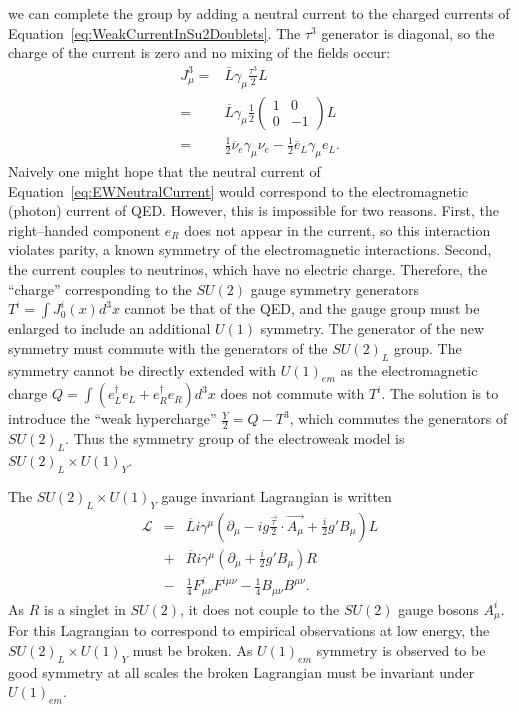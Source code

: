 we can complete the group by adding a neutral current to the charged currents of
Equation~\ref{eq:WeakCurrentInSu2Doublets}.  The $\tau^3$ generator is diagonal,
so the charge of the current is zero and no mixing of the fields occur:
\begin{eqnarray}
  J^3_\mu =& \overline L \gamma_\mu \frac{\tau^3}{2} L \nonumber \\
  =& \overline L \gamma_\mu  \frac{1}{2} 
  \left(\begin{array}{cc} 1 & 0 \\ 0 & -1 \end{array}\right) L \nonumber \\
    =&  \frac{1}{2} \overline \nu_e \gamma_\mu \nu_e - \frac{1}{2} \overline e_L
    \gamma_\mu e_L.
    \label{eq:EWNeutralCurrent}
\end{eqnarray}
Naively one might hope that the neutral current of
Equation~\ref{eq:EWNeutralCurrent} would correspond to the electromagnetic
(photon) current of QED\@.  However, this is impossible for two reasons.  First,
the right--handed component $e_R$ does not appear in the current, so this
interaction violates parity, a known symmetry of the electromagnetic
interactions.  Second, the current couples to neutrinos, which have no electric
charge.   Therefore, the ``charge'' corresponding to the $SU(2)$ gauge symmetry
generators $T^i = \int J_0^i(x)d^3x$ cannot be that of the QED\@, and the gauge
group must be enlarged to include an additional $U(1)$ symmetry.  The generator
of the new symmetry must commute with the generators of the $SU(2)_L$ group.
The symmetry cannot be directly extended with $U(1)_{em}$ as the electromagnetic
charge $Q = \int (e^\dag_L e_L +  e^\dag_R e_R) d^3x$ does not commute with
$T^i$.  The solution is to introduce the ``weak hypercharge'' $\frac{Y}{2} = Q -
T^3$, which commutes the generators of $SU(2)_L$.  Thus the symmetry group of the
electroweak model is $SU(2)_L\times U(1)_Y$.

The $SU(2)_L\times U(1)_Y$ gauge invariant Lagrangian is written 
\begin{eqnarray}
  \mathcal{L} &=& 
  \overline L i \gamma^\mu (\partial_\mu - i g \frac{\vec \tau}{2} \cdot \vec
  {A_\mu} + \frac{i}{2}g'B_\mu)L \nonumber \\
  &+& \overline R i \gamma^\mu (\partial_\mu + \frac{i}{2}g'B_\mu)R \nonumber \\
  &-& \frac{1}{4}F^i_{\mu\nu} F^{i\mu\nu} -\frac{1}{4}B_{\mu\nu} B^{\mu\nu}.  
  \nonumber
\end{eqnarray}
As $R$ is a singlet in $SU(2)$, it does not couple to the $SU(2)$ gauge bosons
$A^i_\mu$.  For this Lagrangian to correspond to empirical observations at low
energy, the $SU(2)_L \times U(1)_Y$ must be broken.  As $U(1)_{em}$ symmetry 
is observed to be good symmetry at all scales the broken Lagrangian must
be invariant under $U(1)_{em}$.

